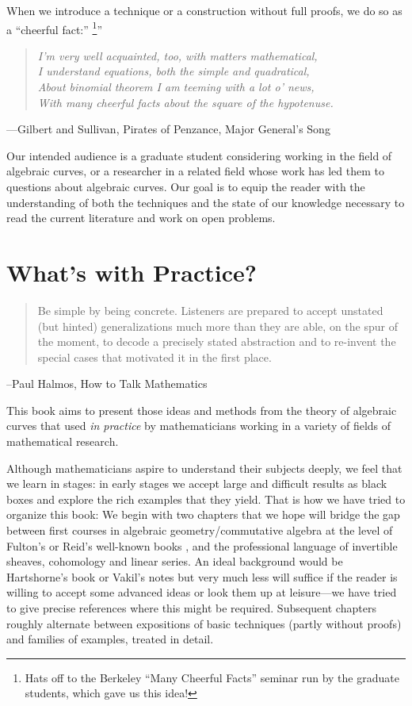 When we introduce a technique or a construction without full proofs, we do so as a ``cheerful fact:'' \footnote{Hats off to the Berkeley ``Many Cheerful Facts'' seminar run
by the graduate students, which gave us this idea!}''

\begin{quote}\it{I'm very well acquainted, too, with matters mathematical,\\
I understand equations, both the simple and quadratical,\\
About binomial theorem I am teeming with a lot o' news,\\
With many cheerful facts about the square of the hypotenuse.}
\end{quote}
---Gilbert and Sullivan, Pirates of Penzance, Major General's Song


Our intended audience is a graduate student considering working in the field of algebraic curves, or a researcher in a related field whose work has led them to questions about algebraic curves. Our goal is to equip the reader with the understanding of both the techniques and the state of our knowledge necessary to read the current literature and work on open problems.

\section{What's with Practice?}

\begin{quote}
Be simple by being concrete. Listeners are prepared to
accept unstated (but hinted) generalizations much more than they are able, on the spur of the moment, to
decode a precisely stated abstraction and to re-invent the special cases that motivated it in the first place. 
\end{quote}

--Paul Halmos, How to Talk Mathematics

This book aims to present those ideas and methods from the theory of  algebraic curves that  used \emph{in practice} by mathematicians working in a variety of fields of mathematical research.

Although mathematicians aspire to understand their subjects deeply, we feel that we learn in stages: in early stages we accept large and difficult results as black boxes and explore the rich examples that they yield. That is how we have tried to organize this book: 
We begin with two chapters that we hope will bridge the gap between first courses in algebraic geometry/commutative algebra at the level of Fulton's or  Reid's well-known books \cite{Fulton1989}, \cite{MR982494} and the professional language of invertible sheaves, cohomology and linear series. An ideal background would
be Hartshorne's book \cite{Hartshorne1977} or Vakil's notes \cite{Vakil-notes} but very much less will suffice if the reader is willing to accept some advanced ideas or look them up at leisure---we have tried to give precise references where this might be required. Subsequent chapters roughly alternate between expositions of basic techniques (partly without proofs) and families of examples, treated in detail. 


